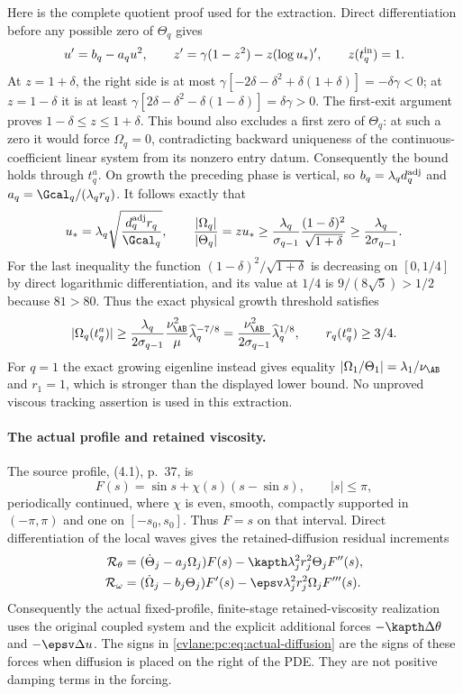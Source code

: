 Here is the complete quotient proof used for the extraction. Direct differentiation before any possible zero of $\Theta_q$ gives
\[
 u'=b_q-a_qu^2,\qquad z'=\gamma(1-z^2)-z(\log u_*)',\qquad z(t_q^{\rm in})=1.
\]
At $z=1+\delta$, the right side is at most
$\gamma[-2\delta-\delta^2+\delta(1+\delta)]=-\delta\gamma<0$;
at $z=1-\delta$ it is at least
$\gamma[2\delta-\delta^2-\delta(1-\delta)]=\delta\gamma>0$.
The first-exit argument proves $1-\delta\le z\le1+\delta$. This bound also excludes a first zero of $\Theta_q$: at such a zero it would force $\Omega_q=0$, contradicting backward uniqueness of the continuous-coefficient linear system from its nonzero entry datum. Consequently the bound holds through $t_q^a$.
On growth the preceding phase is vertical, so $b_q=\lambda_qd_q^{\rm adj}$ and $a_q=\Gcal_q/(\lambda_qr_q)$. It follows exactly that
\[
 u_*=\lambda_q\sqrt{\frac{d_q^{\rm adj}r_q}{\Gcal_q}},\qquad
 \frac{|\Omega_q|}{|\Theta_q|}=zu_*
 \ge\frac{\lambda_q}{\sigma_{q-1}}
 \frac{(1-\delta)^2}{\sqrt{1+\delta}}
 \ge\frac{\lambda_q}{2\sigma_{q-1}}.
\]
For the last inequality the function $(1-\delta)^2/\sqrt{1+\delta}$ is decreasing on $[0,1/4]$ by direct logarithmic differentiation, and its value at $1/4$ is $9/(8\sqrt5)>1/2$ because $81>80$. Thus the exact physical growth threshold satisfies
\begin{equation}\label{cvlane:pc:eq:omega-lower}
 |\Omega_q(t_q^a)|\ge\frac{\lambda_q}{2\sigma_{q-1}}
 \frac{\nu_{\AB}^2}{\mu}\widehat\lambda_q^{-7/8}
 =\frac{\nu_{\AB}^2}{2\sigma_{q-1}}\widehat\lambda_q^{1/8},
 \qquad r_q(t_q^a)\ge3/4.
\end{equation}
For $q=1$ the exact growing eigenline instead gives equality $|\Omega_1/\Theta_1|=\lambda_1/\nu_{\AB}$ and $r_1=1$, which is stronger than the displayed lower bound. No unproved viscous tracking assertion is used in this extraction.

\paragraph{The actual profile and retained viscosity.}
The source profile, (4.1), p.~37, is
\[
 F(s)=\sin s+\chi(s)(s-\sin s),\qquad |s|\le\pi,
\]
periodically continued, where $\chi$ is even, smooth, compactly supported in $(-\pi,\pi)$ and one on $[-s_0,s_0]$. Thus $F=s$ on that interval. Direct differentiation of the local waves gives the retained-diffusion residual increments
\begin{align}
 \mathcal R_\theta&=(\dot\Theta_j-a_j\Omega_j)F(s)-\kapth\lambda_j^2r_j^2\Theta_jF''(s),\label{cvlane:pc:eq:actual-diffusion}\\
 \mathcal R_\omega&=(\dot\Omega_j-b_j\Theta_j)F'(s)-\epsv\lambda_j^2r_j^2\Omega_jF'''(s).\nonumber
\end{align}
Consequently the actual fixed-profile, finite-stage retained-viscosity realization uses the original coupled system and the explicit additional forces $-\kapth\Delta\theta$ and $-\epsv\Delta u$. The signs in \eqref{cvlane:pc:eq:actual-diffusion} are the signs of these forces when diffusion is placed on the right of the PDE. They are not positive damping terms in the forcing.


